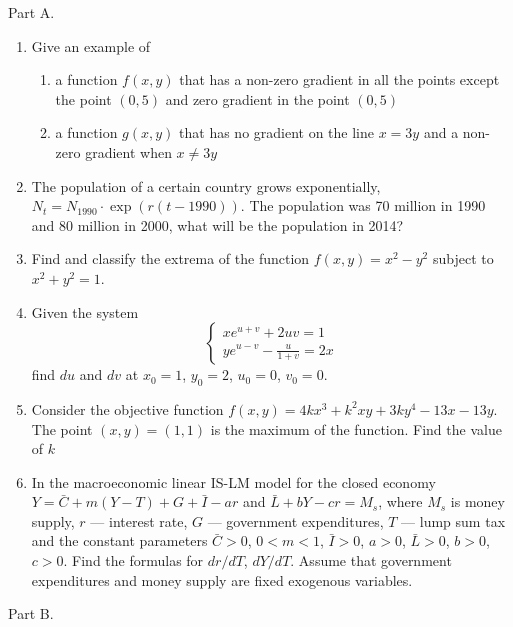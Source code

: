 \documentclass[12pt]{article} %
\theoremstyle{definition} %
\begin{document}
Part A.

\begin{enumerate}
\item Give an example of
\begin{enumerate}
\item a function $f(x,y)$ that has a non-zero gradient in all the points except the point $(0,5)$ and zero gradient in the point $(0,5)$
\item a function $g(x,y)$ that has no gradient on the line $x=3y$ and a non-zero gradient when $x\neq 3y$
\end{enumerate}

\item The population of a certain country grows exponentially, $N_t= N_{1990}\cdot \exp (r(t-1990))$. The population was 70 million in 1990 and 80 million in 2000,
what will be the population in 2014?

\item Find and classify the extrema of the function $f(x,y)=x^2-y^2$ subject to $x^2+y^2=1$.

\item Given the system
\[
\begin{cases}
xe^{u+v}+2uv=1 \\
ye^{u-v}-\frac{u}{1+v}=2x
\end{cases}
\]
find $du$ and $dv$ at $x_0 = 1$, $y_0 = 2$, $u_0 = 0$, $v_0 = 0$.



\item Consider the objective function $f(x,y)=4kx^3+k^2xy+3ky^4-13x-13y$. The point $(x,y)=(1,1)$ is the maximum of the function. Find the value of $k$

\item In the macroeconomic linear IS-LM model for the closed economy
$Y=\bar{C}+m(Y-T)+G+\bar{I}-ar$ and $\bar{L}+bY-cr=M_s$, where $M_s$ is money supply, $r$ --- interest rate, $G$ --- government expenditures, $T$ --- lump sum tax and the constant parameters $\bar{C}>0$, $0<m<1$, $\bar{I}>0$, $a>0$, $\bar{L}>0$, $b>0$, $c>0$. Find the formulas for $dr/dT$, $dY/dT$. Assume that government expenditures and money supply are fixed exogenous variables.
\end{enumerate}


Part B.
\end{document}
